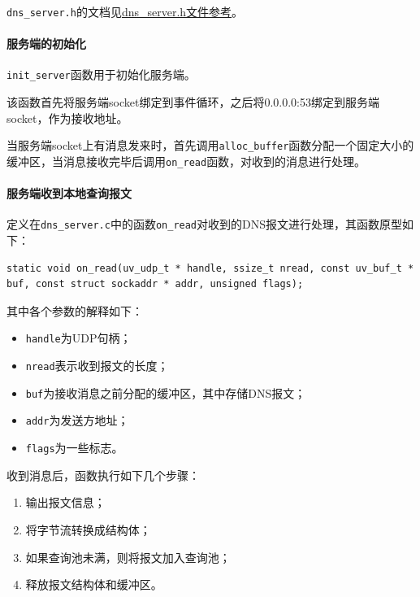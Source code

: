 \documentclass[lang=cn,11pt,a4paper,cite=authornum]{paper}
\begin{document}
\texttt{dns_server.h}的文档见\href{run:./APIdoc/dns__server_8h.html}{dns\_server.h文件参考}。

\paragraph{服务端的初始化}

\texttt{init_server}函数用于初始化服务端。

该函数首先将服务端socket绑定到事件循环，之后将0.0.0.0:53绑定到服务端socket，作为接收地址。

当服务端socket上有消息发来时，首先调用\texttt{alloc_buffer}函数分配一个固定大小的缓冲区，当消息接收完毕后调用\texttt{on_read}函数，对收到的消息进行处理。

\paragraph{服务端收到本地查询报文}

定义在\texttt{dns_server.c}中的函数\texttt{on_read}对收到的DNS报文进行处理，其函数原型如下：

\begin{code}
\begin{verbatim}
static void on_read(uv_udp_t * handle, ssize_t nread, const uv_buf_t * buf, const struct sockaddr * addr, unsigned flags);
\end{verbatim}
\end{code}

其中各个参数的解释如下：

\begin{itemize}
    \item \texttt{handle}为UDP句柄；
    \item \texttt{nread}表示收到报文的长度；
    \item \texttt{buf}为接收消息之前分配的缓冲区，其中存储DNS报文；
    \item \texttt{addr}为发送方地址；
    \item \texttt{flags}为一些标志。
\end{itemize}

收到消息后，函数执行如下几个步骤：

\begin{enumerate}
    \item 输出报文信息；
    \item 将字节流转换成结构体；
    \item 如果查询池未满，则将报文加入查询池；
    \item 释放报文结构体和缓冲区。
\end{enumerate}
\end{document}
